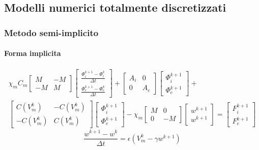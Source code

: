 \documentclass[a4paper]{article}
\theoremstyle{definition}
\begin{document}
\subsection{Modelli numerici totalmente discretizzati}
\vspace{4mm}
\subsubsection{Metodo semi-implicito}
\paragraph{Forma implicita}
\begin{equation}
\begin{gathered}
\chi_mC_m \begin{bmatrix}M &-M \\ -M & M \end{bmatrix}
\begin{bmatrix}\frac{\Phi_i^{k+1}-\Phi_i^k}{\Delta t} \\ \frac{\Phi_e^{k+1}-\Phi_e^k}{\Delta t} \end{bmatrix}
+ \begin{bmatrix}A_i & 0 \\ 0 & A_e \end{bmatrix}
\begin{bmatrix}\Phi_i^{k+1} \\ \Phi_e^{k+1} \end{bmatrix} + \\
 \begin{bmatrix}C(V_m^k) & -C(V_m^k) \\ -C(V_m^k) & C(V_m^k) \end{bmatrix} 
\begin{bmatrix} \Phi_i^{k+1} \\ \Phi_e^{k+1}  \end{bmatrix} 
-\chi_m \begin{bmatrix}M & 0 \\ 0 & -M \end{bmatrix} 
\begin{bmatrix}w^{k+1} \\ w^{k+1} \end{bmatrix} = 
\begin{bmatrix} F_i^{k+1} \\ F_e^{k+1}\end{bmatrix}
\end{gathered}
\end{equation}
\vspace{5mm}
\begin{equation}
\frac{w^{k+1}-w^k}{\Delta t} = \epsilon (V_m^k - \gamma w^{k+1})
\end{equation}
\end{document}
